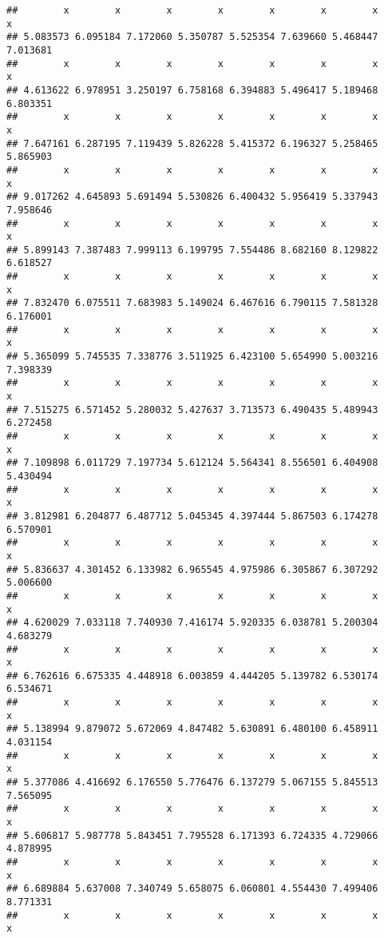 \documentclass[a4paper,10pt]{book}\usepackage[]{graphicx}\usepackage[]{color}
\makeatletter
\newenvironment{kframe}{%
 \def\at@end@of@kframe{}%
 \ifinner\ifhmode%
  \def\at@end@of@kframe{\end{minipage}}%
  \begin{minipage}{\columnwidth}%
 \fi\fi%
 \def\FrameCommand##1{\hskip\@totalleftmargin \hskip-\fboxsep
 \colorbox{shadecolor}{##1}\hskip-\fboxsep
     \hskip-\linewidth \hskip-\@totalleftmargin \hskip\columnwidth}%
 \MakeFramed {\advance\hsize-\width
   \@totalleftmargin\z@ \linewidth\hsize
   \@setminipage}}%
 {\par\unskip\endMakeFramed%
 \at@end@of@kframe}
\newenvironment{knitrout}{}{} %
\makeatother
\begin{document}
\begin{knitrout}
\begin{kframe}
\begin{verbatim}
##        x        x        x        x        x        x        x        x 
## 5.083573 6.095184 7.172060 5.350787 5.525354 7.639660 5.468447 7.013681 
##        x        x        x        x        x        x        x        x 
## 4.613622 6.978951 3.250197 6.758168 6.394883 5.496417 5.189468 6.803351 
##        x        x        x        x        x        x        x        x 
## 7.647161 6.287195 7.119439 5.826228 5.415372 6.196327 5.258465 5.865903 
##        x        x        x        x        x        x        x        x 
## 9.017262 4.645893 5.691494 5.530826 6.400432 5.956419 5.337943 7.958646 
##        x        x        x        x        x        x        x        x 
## 5.899143 7.387483 7.999113 6.199795 7.554486 8.682160 8.129822 6.618527 
##        x        x        x        x        x        x        x        x 
## 7.832470 6.075511 7.683983 5.149024 6.467616 6.790115 7.581328 6.176001 
##        x        x        x        x        x        x        x        x 
## 5.365099 5.745535 7.338776 3.511925 6.423100 5.654990 5.003216 7.398339 
##        x        x        x        x        x        x        x        x 
## 7.515275 6.571452 5.280032 5.427637 3.713573 6.490435 5.489943 6.272458 
##        x        x        x        x        x        x        x        x 
## 7.109898 6.011729 7.197734 5.612124 5.564341 8.556501 6.404908 5.430494 
##        x        x        x        x        x        x        x        x 
## 3.812981 6.204877 6.487712 5.045345 4.397444 5.867503 6.174278 6.570901 
##        x        x        x        x        x        x        x        x 
## 5.836637 4.301452 6.133982 6.965545 4.975986 6.305867 6.307292 5.006600 
##        x        x        x        x        x        x        x        x 
## 4.620029 7.033118 7.740930 7.416174 5.920335 6.038781 5.200304 4.683279 
##        x        x        x        x        x        x        x        x 
## 6.762616 6.675335 4.448918 6.003859 4.444205 5.139782 6.530174 6.534671 
##        x        x        x        x        x        x        x        x 
## 5.138994 9.879072 5.672069 4.847482 5.630891 6.480100 6.458911 4.031154 
##        x        x        x        x        x        x        x        x 
## 5.377086 4.416692 6.176550 5.776476 6.137279 5.067155 5.845513 7.565095 
##        x        x        x        x        x        x        x        x 
## 5.606817 5.987778 5.843451 7.795528 6.171393 6.724335 4.729066 4.878995 
##        x        x        x        x        x        x        x        x 
## 6.689884 5.637008 7.340749 5.658075 6.060801 4.554430 7.499406 8.771331 
##        x        x        x        x        x        x        x        x 

\end{verbatim}
\end{kframe}
\end{knitrout}
\end{document}
